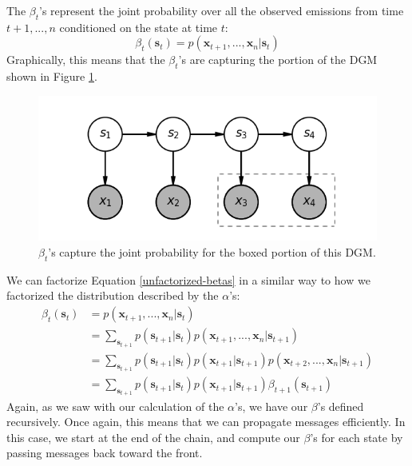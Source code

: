 The $\beta_t$'s represent the joint probability over all the observed emissions from time $t+1, ..., n$ conditioned on the state at time $t$:
\begin{equation} \label{unfactorized-betas}
	\beta_t(\textbf{s}_t) = p(\textbf{x}_{t+1}, ..., \textbf{x}_n | \textbf{s}_t)
\end{equation}
Graphically, this means that the $\beta_t$'s are capturing the portion of the DGM shown in Figure \ref{fig:HMM-DGM-beta}.
\begin{figure}
    \centering
    \includegraphics[width=0.5\paperwidth]{../HiddenMarkovModels/fig/HMM_DGM_beta.png}
    \caption{$\beta_t$'s capture the joint probability for the boxed portion of this DGM.}
    \label{fig:HMM-DGM-beta}
\end{figure}

We can factorize Equation \ref{unfactorized-betas} in a similar way to how we factorized the distribution described by the $\alpha$'s:
\begin{align} \label{factorized-betas}
	\beta_t(\textbf{s}_t) &= p(\textbf{x}_{t+1}, ..., \textbf{x}_n | \textbf{s}_t) \\
	&= \sum_{\textbf{s}_{t+1}} p(\textbf{s}_{t+1} | \textbf{s}_t) p(\textbf{x}_{t+1}, ..., \textbf{x}_n | \textbf{s}_{t+1}) \\
	&= \sum_{\textbf{s}_{t+1}} p(\textbf{s}_{t+1} | \textbf{s}_t) p(\textbf{x}_{t+1} | \textbf{s}_{t+1}) p(\textbf{x}_{t+2}, ..., \textbf{x}_n | \textbf{s}_{t+1}) \\
	&= \sum_{\textbf{s}_{t+1}} p(\textbf{s}_{t+1} | \textbf{s}_t) p(\textbf{x}_{t+1} | \textbf{s}_{t+1}) \beta_{t+1}(\textbf{s}_{t+1})
\end{align}
Again, as we saw with our calculation of the $\alpha$'s, we have our $\beta$'s defined recursively. Once again, this means that we can propagate messages efficiently. In this case, we start at the end of the chain, and compute our $\beta$'s for each state by passing messages back toward the front.

